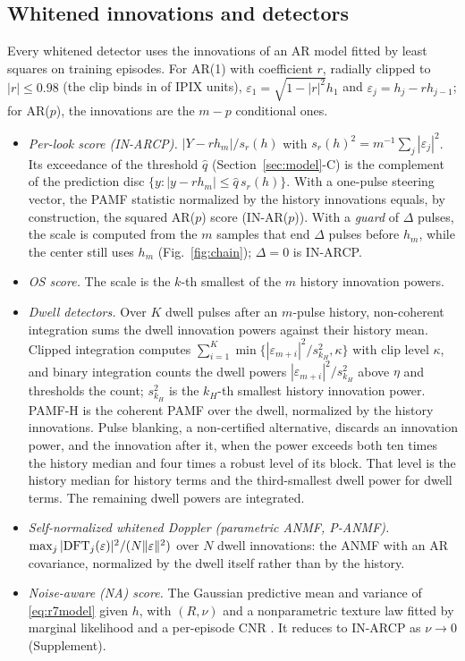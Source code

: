 \documentclass[journal]{IEEEtran}
\begin{document}
\subsection{Whitened innovations and detectors}
Every whitened detector uses the innovations of an AR model fitted by least squares on training episodes. For AR(1) with coefficient $r$, radially clipped to $|r|\le0.98$ (the clip binds in \FitClampBinding{} of \NUnitsConf{} IPIX units), $\varepsilon_1=\sqrt{1-|r|^2}h_1$ and $\varepsilon_j=h_j-rh_{j-1}$; for AR($p$), the innovations are the $m-p$ conditional ones.
\begin{itemize}[leftmargin=*,itemsep=1pt]
\item \emph{Per-look score (IN-ARCP).} $|Y-rh_m|/s_r(h)$ with $s_r(h)^2=m^{-1}\sum_j|\varepsilon_j|^2$. Its exceedance of the threshold $\widehat q$ (Section~\ref{sec:model}-C) is the complement of the prediction disc $\{y:|y-rh_m|\le\widehat q\,s_r(h)\}$. With a one-pulse steering vector, the PAMF statistic normalized by the history innovations equals, by construction, the squared AR($p$) score (IN-AR($p$)). With a \emph{guard} of $\Delta$ pulses, the scale is computed from the $m$ samples that end $\Delta$ pulses before $h_m$, while the center still uses $h_m$ (Fig.~\ref{fig:chain}); $\Delta=0$ is IN-ARCP.
\item \emph{OS score.} The scale is the $k$-th smallest of the $m$ history innovation powers.
\item \emph{Dwell detectors.} Over $K$ dwell pulses after an $m$-pulse history, non-coherent integration sums the dwell innovation powers against their history mean. Clipped integration computes $\sum_{i=1}^K\min\{|\varepsilon_{m+i}|^2/s_{k_H}^2,\kappa\}$ with clip level $\kappa$, and binary integration counts the dwell powers $|\varepsilon_{m+i}|^2/s_{k_H}^2$ above $\eta$ and thresholds the count; $s_{k_H}^2$ is the $k_H$-th smallest history innovation power. PAMF-H is the coherent PAMF over the dwell, normalized by the history innovations. Pulse blanking, a non-certified alternative, discards an innovation power, and the innovation after it, when the power exceeds both ten times the history median and four times a robust level of its block. That level is the history median for history terms and the third-smallest dwell power for dwell terms. The remaining dwell powers are integrated.
\item \emph{Self-normalized whitened Doppler (parametric ANMF, P-ANMF).} $\max_j|{\rm DFT}_j(\varepsilon)|^2/(N\|\varepsilon\|^2)$ over $N$ dwell innovations: the ANMF with an AR covariance, normalized by the dwell itself rather than by the history.
\item \emph{Noise-aware (NA) score.} The Gaussian predictive mean and variance of \eqref{eq:r7model} given $h$, with $(R,\nu)$ and a nonparametric texture law fitted by marginal likelihood and a per-episode CNR \cite{ignatiadis2025}. It reduces to IN-ARCP as $\nu\to0$ (Supplement).
\end{itemize}
\end{document}
